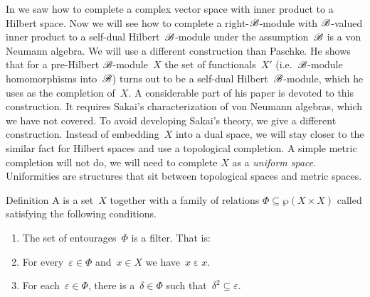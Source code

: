 \documentclass[b]{subfiles}
\begin{document}
\begin{parsec}%
\begin{point}%
In 
    we saw how to complete a complex vector space with inner product
    to a Hilbert space.
Now we will see how to complete a right-$\mathscr{B}$-module
    with $\mathscr{B}$-valued inner product
    to a self-dual Hilbert~$\mathscr{B}$-module
    under the assumption~$\mathscr{B}$ is a von Neumann algebra.
We will use a different construction than Paschke.
He shows that for a pre-Hilbert $\mathscr{B}$-module~$X$
    the set of functionals~$X'$
        (i.e.~$\mathscr{B}$-module homomorphisms into~$\mathscr{B}$)
    turns out to  be a self-dual Hilbert~$\mathscr{B}$-module,
    which he uses as the completion of~$X$.
A considerable part of his paper \cite{paschke}
    is devoted to this construction.
It requires Sakai's characterization of von Neumann algebras,
    which we have not covered.
To avoid developing Sakai's theory,
    we give a different construction.
Instead of embedding~$X$ into a dual space,
    we will stay closer to the similar fact for Hilbert spaces
    and use a topological completion.
A simple metric completion will not do,
    we will need to complete $X$ as a \emph{uniform space}.
Uniformities are structures that sit between topological spaces
and metric spaces.
\end{point}
\begin{point}{Definition}%
    A  is a set~$X$
    together with a family of relations
    $\Phi \subseteq \wp (X\times X)$ called 
        satisfying the following conditions.
    \begin{enumerate}
    \item
        The set of entourages~$\Phi$ is a filter.
        That is:
    \item
        For every~$\varepsilon \in \Phi$
            and~$x \in X$ we have~$x \mathrel\varepsilon x$.
    \item
        For each~$\varepsilon \in \Phi$,
            there is a~$\delta \in \Phi$
            such that~$\delta^2 \subseteq \varepsilon$.

\end{enumerate}
\end{point}
\end{parsec}
\end{document}
